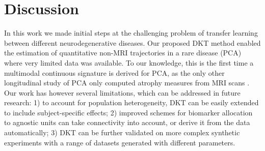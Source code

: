 \documentclass{llncs}
\begin{document}
\section{Discussion}
\label{sec:dktDis}

In this work we made initial steps at the challenging problem of transfer learning between different neurodegenerative diseases. Our proposed DKT method enabled the estimation of quantitative non-MRI trajectories in a rare disease (PCA) where very limited data was available. To our knowledge, this is the first time a multimodal continuous signature is derived for PCA, as the only other longitudinal study of PCA only computed atrophy measures from MRI scans \cite{lehmann2011cortical}. Our work has however several limitations, which can be addressed in future research: 1) to account for population heterogeneity, DKT can be easily extended to include subject-specific effects; 2) improved schemes for biomarker allocation to agnostic units can take connectivity into account, or derive it from the data automatically; 3) DKT can be further validated on more complex synthetic experiments with a range of datasets generated with different parameters.


% 
\end{document}
